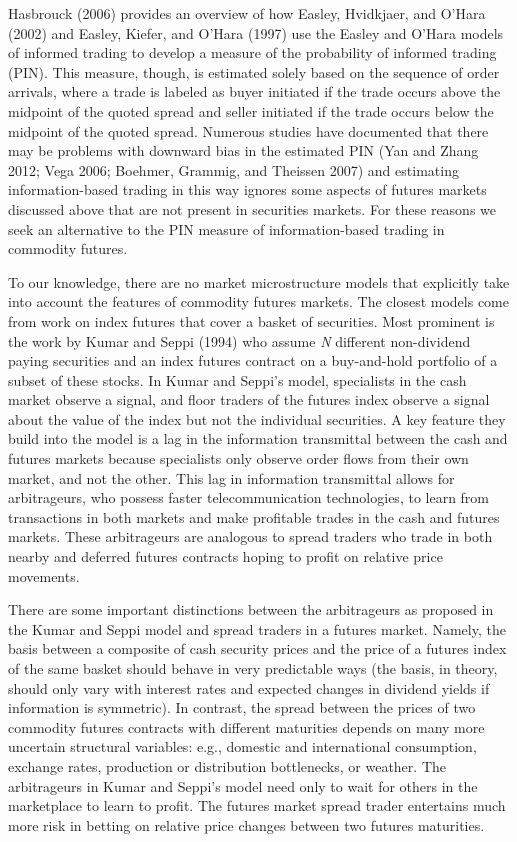 \documentclass[review,12pt]{elsarticle}
\begin{document}
Hasbrouck (2006) provides an overview of how Easley, Hvidkjaer, and
O'Hara (2002) and Easley, Kiefer, and O'Hara (1997) use the Easley and
O'Hara models of informed trading to develop a measure of the
probability of informed trading (PIN). This measure, though, is
estimated solely based on the sequence of order arrivals, where a trade
is labeled as buyer initiated if the trade occurs above the midpoint of
the quoted spread and seller initiated if the trade occurs below the
midpoint of the quoted spread. Numerous studies have documented that
there may be problems with downward bias in the estimated PIN (Yan and
Zhang 2012; Vega 2006; Boehmer, Grammig, and Theissen 2007) and
estimating information-based trading in this way ignores some aspects of
futures markets discussed above that are not present in securities
markets. For these reasons we seek an alternative to the PIN measure of
information-based trading in commodity futures.

To our knowledge, there are no market microstructure models that
explicitly take into account the features of commodity futures markets.
The closest models come from work on index futures that cover a basket
of securities. Most prominent is the work by Kumar and Seppi (1994) who
assume \emph{N} different non-dividend paying securities and an index
futures contract on a buy-and-hold portfolio of a subset of these
stocks. In Kumar and Seppi's model, specialists in the cash market
observe a signal, and floor traders of the futures index observe a
signal about the value of the index but not the individual securities. A
key feature they build into the model is a lag in the information
transmittal between the cash and futures markets because specialists
only observe order flows from their own market, and not the other. This
lag in information transmittal allows for arbitrageurs, who possess
faster telecommunication technologies, to learn from transactions in
both markets and make profitable trades in the cash and futures markets.
These arbitrageurs are analogous to spread traders who trade in both
nearby and deferred futures contracts hoping to profit on relative price
movements.

There are some important distinctions between the arbitrageurs as
proposed in the Kumar and Seppi model and spread traders in a futures
market. Namely, the basis between a composite of cash security prices
and the price of a futures index of the same basket should behave in
very predictable ways (the basis, in theory, should only vary with
interest rates and expected changes in dividend yields if information is
symmetric). In contrast, the spread between the prices of two commodity
futures contracts with different maturities depends on many more
uncertain structural variables: e.g., domestic and international
consumption, exchange rates, production or distribution bottlenecks, or
weather. The arbitrageurs in Kumar and Seppi's model need only to wait
for others in the marketplace to learn to profit. The futures market
spread trader entertains much more risk in betting on relative price
changes between two futures maturities.
\end{document}
